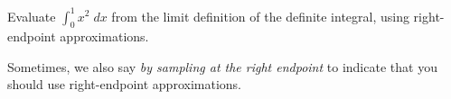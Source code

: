\documentclass[../main.tex]{subfiles}
\begin{document}
\begin{exercise}
  Evaluate \(\int_{0}^{1} x^{2} \;dx\) from the limit definition of the definite integral, using right-endpoint approximations. 

  {\footnotesize Sometimes, we also say \emph{by sampling at the right endpoint} to indicate that you should use right-endpoint approximations.}

  \blanks*
\end{exercise}
\clearpage
\end{document}
